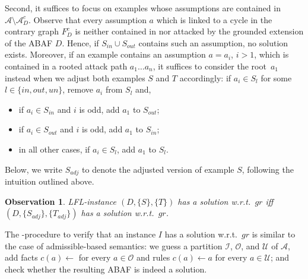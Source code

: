 \documentclass[letterpaper]{article} %
\newcommand{\grd}{\textit{gr}}
\newcommand{\asms}{\asm}
\newcommand{\asm}{\ensuremath{\mathcal{A}}}
\newcommand{\contrary}[1]{c(#1)}
\newcommand{\contraryAF}[1]{F^{c}_{#1}}
\newcommand{\contraryArgs}[1]{\asm^{c}_{#1}}
\newtheorem{observation}[example]{Observation}
\begin{document}
Second, it suffices to focus on examples whose assumptions are contained in $\asm\setminus \contraryArgs{D}$. 
Observe that every assumption $a$ which is linked to a cycle in the contrary graph $\contraryAF{D}$ is neither contained in nor attacked by the grounded extension of the ABAF $D$. 
Hence, if $S_{in}\cup S_{out}$ contains such an assumption, no solution exists.
Moreover, if an example contains an assumption $a=a_i$, $i>1$, which is contained in a rooted attack path $a_1\dots a_n$, it suffices to consider the root~$a_1$ instead when we 
adjust both examples $S$ and $T$ accordingly: 
if $a_i\in S_l$ for some $l\in \{in,out,un\}$, remove $a_i$ from $S_l$ and,
\begin{itemize}
    \item if $a_i\in S_{in}$ and $i$ is odd, add $a_1$ to $S_{out}$;
    \item if $a_i\in S_{out}$ and $i$ is odd, add $a_1$ to $S_{in}$;
    \item in all other cases, if $a_i\in S_{l}$, add $a_1$ to $S_{l}$.
\end{itemize}
Below, we write $S_{adj}$ to denote the adjusted version of example $S$, following the intuition outlined above. 
\begin{observation}
    LFL-instance $(D,\{S\},\{T\})$ has a solution w.r.t.\ $\grd$ iff $(D,\{S_{adj}\},\{T_{adj}\})$ has a solution w.r.t.~$\grd$.
\end{observation}
The \NP-procedure to verify that an instance $I$ has a solution w.r.t.\ $\grd$ is similar to the case of admissible-based semantics: we guess a partition $\mathcal{I}$, $\mathcal{O}$, and $\mathcal{U}$ of $\asms$, add facts $\contrary{a}\gets$ for every $a\in \mathcal{O}$ and rules $\contrary{a}\gets a$ for every $a\in \mathcal{U}$; and check whether the resulting ABAF is indeed a solution. 
%
\end{document}
